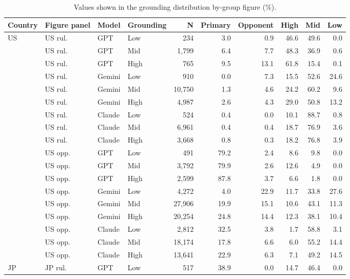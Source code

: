 \begin{table}[t]
\centering
\footnotesize
\setlength{\tabcolsep}{2pt}
\caption{Values shown in the grounding distribution by-group figure (\%).}
\label{tab:grounding-by-group-values}
\begin{tabular}{llllrrrrrr}
\toprule
\textbf{Country} & \textbf{Figure panel} & \textbf{Model} & \textbf{Grounding} & \textbf{N} & \textbf{Primary} & \textbf{Opponent} & \textbf{High} & \textbf{Mid} & \textbf{Low} \\
\midrule
US & US rul. & GPT & Low & 234 & 3.0 & 0.9 & 46.6 & 49.6 & 0.0 \\
 & US rul. & GPT & Mid & 1{,}799 & 6.4 & 7.7 & 48.3 & 36.9 & 0.6 \\
 & US rul. & GPT & High & 765 & 9.5 & 13.1 & 61.8 & 15.4 & 0.1 \\
 & US rul. & Gemini & Low & 910 & 0.0 & 7.3 & 15.5 & 52.6 & 24.6 \\
 & US rul. & Gemini & Mid & 10{,}750 & 1.3 & 4.6 & 24.2 & 60.2 & 9.6 \\
 & US rul. & Gemini & High & 4{,}987 & 2.6 & 4.3 & 29.0 & 50.8 & 13.2 \\
 & US rul. & Claude & Low & 524 & 0.4 & 0.0 & 10.1 & 88.7 & 0.8 \\
 & US rul. & Claude & Mid & 6{,}961 & 0.4 & 0.4 & 18.7 & 76.9 & 3.6 \\
 & US rul. & Claude & High & 3{,}668 & 0.8 & 0.3 & 18.2 & 76.8 & 3.9 \\
\cmidrule(lr){2-10}
 & US opp. & GPT & Low & 491 & 79.2 & 2.4 & 8.6 & 9.8 & 0.0 \\
 & US opp. & GPT & Mid & 3{,}792 & 79.9 & 2.6 & 12.6 & 4.9 & 0.0 \\
 & US opp. & GPT & High & 2{,}599 & 87.8 & 3.7 & 6.6 & 1.8 & 0.0 \\
 & US opp. & Gemini & Low & 4{,}272 & 4.0 & 22.9 & 11.7 & 33.8 & 27.6 \\
 & US opp. & Gemini & Mid & 27{,}906 & 19.9 & 15.1 & 10.6 & 43.1 & 11.3 \\
 & US opp. & Gemini & High & 20{,}254 & 24.8 & 14.4 & 12.3 & 38.1 & 10.4 \\
 & US opp. & Claude & Low & 2{,}812 & 32.5 & 3.8 & 1.7 & 58.8 & 3.1 \\
 & US opp. & Claude & Mid & 18{,}174 & 17.8 & 6.6 & 6.0 & 55.2 & 14.4 \\
 & US opp. & Claude & High & 13{,}641 & 22.9 & 6.3 & 7.1 & 49.2 & 14.5 \\
\cmidrule(lr){1-10}
JP & JP rul. & GPT & Low & 517 & 38.9 & 0.0 & 14.7 & 46.4 & 0.0 \\

\end{tabular}
\end{table}
